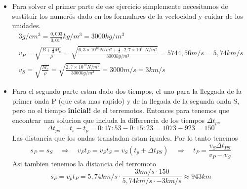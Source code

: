 \begin{itemize}
	\item
	Para solver el primer parte de ese ejercicio simplemente necesitamos de
	sustituir los numerós dado en los formulares de la veclocidad y cuidar de los
	unidades. 
	\begin{align*}
		3 g/cm^3 = \frac{0,003}{0,01^3} kg/m^3 = 3000 kg / m^3 \\
		v_P = \sqrt{\frac{B + \frac{4}{3} M_c}{\rho}} = \sqrt{\frac{6,3\times10^10
	N/m^2 + \frac{4}{3} \cdot 2,7 \times 10^10 N/m^2}{3000 kg/m^3}} = 5744,56 m/s  =
	5,74 km/s \\
		v_S = \sqrt{\frac{M_c}{\rho}} = \sqrt{\frac{2,7\times10^10 N/m^2}{3000
	kg/m^3}} = 3000 m/s = 3 km/s 
	\end{align*}

	\item
	Para el segundo parte estan dado dos tiempos, el uno para la lleggada de la
primer onda P (que esta mas rapido) y de la llegada de la segunda onda S, pero
no el tiempo \textbf{inicial!} de el terremotos. Entonces para tenemos que
encontrar una solucion que includa la differencia de los tiempos $\Delta t_{ps}$
	$$
		\Delta t_{ps} = t_s - t_p = 0:17:53 - 0:15:23 = 1073 - 923 = 150
	$$
	Las distancia que los ondas transladan estan iguales. Por lo tanto tenemos 
	$$
		s_P = s_S \quad \Rightarrow \quad v_P t_P = v_S t_S = v_S (t_p + \Delta
t_{PS}) \quad \Rightarrow \quad t_P = \frac{v_S \Delta t_{PS}}{v_P - v_S}
	$$
	Asi tambien tenemos la distancia del terromoto
	$$	
		s_P = v_p t_P = 5,74 km/s \cdot \frac{3 km/s \cdot 150}{5,74 km/s \cdot
- 3 km/s} \approx 943 km
	$$
\end{itemize}
